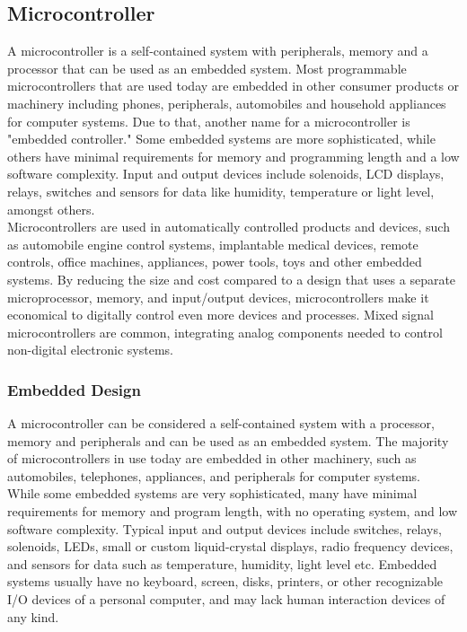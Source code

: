 \subsection{Microcontroller}
A microcontroller is a self-contained system with peripherals, memory and a processor that can be used as an embedded system. Most programmable microcontrollers that are used today are embedded in other consumer products or machinery including phones, peripherals, automobiles and household appliances for computer systems. Due to that, another name for a microcontroller is "embedded controller." Some embedded systems are more sophisticated, while others have minimal requirements for memory and programming length and a low software complexity. Input and output devices include solenoids, LCD displays, relays, switches and sensors for data like humidity, temperature or light level, amongst others.\\
Microcontrollers are used in automatically controlled products and devices, such as automobile engine control systems, implantable medical devices, remote controls, office machines, appliances, power tools, toys and other embedded systems. By reducing the size and cost compared to a design that uses a separate microprocessor, memory, and input/output devices, microcontrollers make it economical to digitally control even more devices and processes. Mixed signal microcontrollers are common, integrating analog components needed to control non-digital electronic systems.
\subsubsection{Embedded Design}
A microcontroller can be considered a self-contained system with a processor, memory and peripherals and can be used as an embedded system. The majority of microcontrollers in use today are embedded in other machinery, such as automobiles, telephones, appliances, and peripherals for computer systems.\\
While some embedded systems are very sophisticated, many have minimal requirements for memory and program length, with no operating system, and low software complexity. Typical input and output devices include switches, relays, solenoids, LEDs, small or custom liquid-crystal displays, radio frequency devices, and sensors for data such as temperature, humidity, light level etc. Embedded systems usually have no keyboard, screen, disks, printers, or other recognizable I/O devices of a personal computer, and may lack human interaction devices of any kind.
